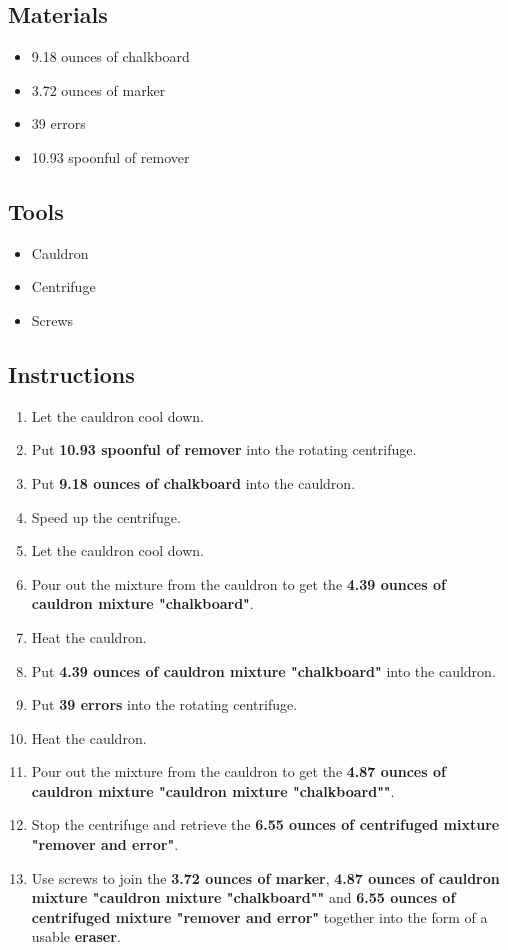 \documentclass{article}
\begin{document}
\subsection{Materials}\begin{itemize}
\item 
9.18 ounces of chalkboard
\item 
3.72 ounces of marker
\item 
39 errors
\item 
10.93 spoonful of remover
\end{itemize}
\subsection{Tools}\begin{itemize}
\item 
Cauldron
\item 
Centrifuge
\item 
Screws
\end{itemize}
\subsection{Instructions}\begin{enumerate}
\item 
Let the cauldron cool down.
\item 
Put \textbf{10.93 spoonful of remover} into the rotating centrifuge.
\item 
Put \textbf{9.18 ounces of chalkboard} into the cauldron.
\item 
Speed up the centrifuge.
\item 
Let the cauldron cool down.
\item 
Pour out the mixture from the cauldron to get the \textbf{4.39 ounces of cauldron mixture "chalkboard"}.
\item 
Heat the cauldron.
\item 
Put \textbf{4.39 ounces of cauldron mixture "chalkboard"} into the cauldron.
\item 
Put \textbf{39 errors} into the rotating centrifuge.
\item 
Heat the cauldron.
\item 
Pour out the mixture from the cauldron to get the \textbf{4.87 ounces of cauldron mixture "cauldron mixture "chalkboard""}.
\item 
Stop the centrifuge and retrieve the \textbf{6.55 ounces of centrifuged mixture "remover and error"}.
\item 
Use screws to join the \textbf{3.72 ounces of marker}, \textbf{4.87 ounces of cauldron mixture "cauldron mixture "chalkboard""} and \textbf{6.55 ounces of centrifuged mixture "remover and error"} together into the form of a usable \textbf{eraser}.
\end{enumerate}
\newpage
\end{document}
